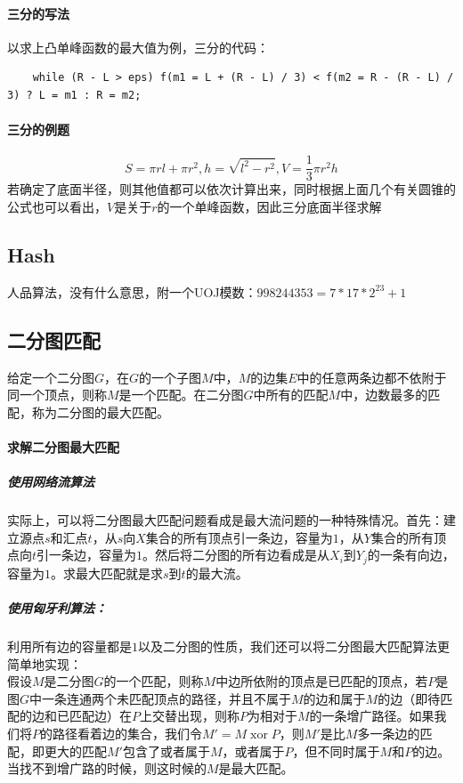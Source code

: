\documentclass[]{cpp}
\begin{document}
\paragraph{三分的写法} 以求上凸单峰函数的最大值为例，三分的代码：
	\begin{verbatim}
	while (R - L > eps) f(m1 = L + (R - L) / 3) < f(m2 = R - (R - L) / 3) ? L = m1 : R = m2;
	\end{verbatim}
\paragraph{三分的例题} $$S=\pi rl+\pi r^2,h=\sqrt{l^2-r^2},V=\frac{1}{3}\pi r^2 h$$
	若确定了底面半径，则其他值都可以依次计算出来，同时根据上面几个有关圆锥的公式也可以看出，$V$是关于$r$的一个单峰函数，因此三分底面半径求解
\subsection{Hash} 人品算法，没有什么意思，附一个UOJ模数：$998244353=7*17*2^{23}+1$
\subsection{二分图匹配}
	给定一个二分图$G$，在$G$的一个子图$M$中，$M$的边集$E$中的任意两条边都不依附于同一个顶点，则称$M$是一个匹配。在二分图$G$中所有的匹配$M$中，边数最多的匹配，称为二分图的最大匹配。
\paragraph{求解二分图最大匹配}
\subparagraph{使用网络流算法} 实际上，可以将二分图最大匹配问题看成是最大流问题的一种特殊情况。首先：建立源点$s$和汇点$t$，从$s$向$X$集合的所有顶点引一条边，容量为$1$，从$Y$集合的所有顶点向$t$引一条边，容量为$1$。然后将二分图的所有边看成是从$X_i$到$Y_j$的一条有向边，容量为$1$。求最大匹配就是求$s$到$t$的最大流。
\subparagraph{使用匈牙利算法：}
利用所有边的容量都是$1$以及二分图的性质，我们还可以将二分图最大匹配算法更简单地实现：\\
假设$M$是二分图$G$的一个匹配，则称$M$中边所依附的顶点是已匹配的顶点，若$P$是图$G$中一条连通两个未匹配顶点的路径，并且不属于$M$的边和属于$M$的边（即待匹配的边和已匹配边）在$P$上交替出现，则称$P$为相对于$M$的一条增广路径。如果我们将$P$的路径看着边的集合，我们令$M'=M \mathop{xor} P$，则$M'$是比$M$多一条边的匹配，即更大的匹配$M'$包含了或者属于$M$，或者属于$P$，但不同时属于$M$和$P$的边。当找不到增广路的时候，则这时候的$M$是最大匹配。
\end{document}
